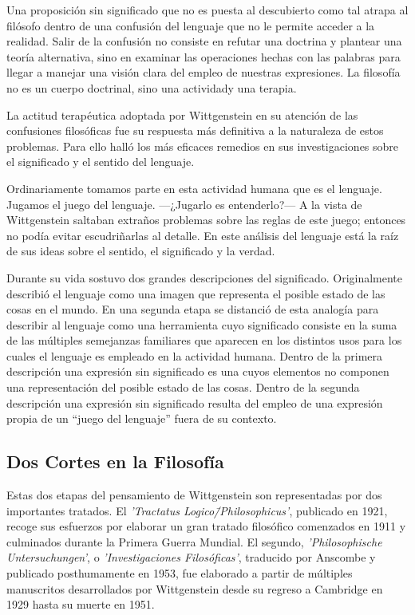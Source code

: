 Una proposición sin significado que no es puesta al descubierto como tal atrapa
al filósofo dentro de una confusión del lenguaje que no le permite acceder a la
realidad. Salir de la confusión no consiste en refutar una doctrina y plantear
una teoría alternativa, sino en examinar las operaciones hechas con las palabras
para llegar a manejar una visión clara del empleo de nuestras expresiones. La
filosofía no es un cuerpo doctrinal, sino una
actividad\autocite[cf.~][4.112]{wittgenstein1922tractatus}y una
terapia\autocite[cf.~][\S133]{wittgenstein1953phiinv}.

La actitud terapéutica adoptada por Wittgenstein en su atención de las
confusiones filosóficas fue su respuesta más definitiva a la naturaleza de estos
problemas. Para ello halló los más eficaces remedios en sus investigaciones
sobre el significado y el sentido del lenguaje.

Ordinariamente tomamos parte en esta actividad humana que es el lenguaje.
Jugamos el juego del lenguaje. ---¿Jugarlo es entenderlo?--- A la vista de
Wittgenstein saltaban extraños problemas sobre las reglas de este juego;
entonces no podía evitar escudriñarlas al
detalle.\autocite[cf.~][loc.7099]{monk1991duty} En este análisis del lenguaje está la
raíz de sus ideas sobre el sentido, el significado y la verdad.

Durante su vida sostuvo dos grandes descripciones del significado. Originalmente
describió el lenguaje como una imagen que representa el posible estado de las
cosas en el mundo. En una segunda etapa se distanció de esta analogía para
describir al lenguaje como una herramienta cuyo significado consiste en la suma
de las múltiples semejanzas familiares que aparecen en los distintos usos para
los cuales el lenguaje es empleado en la actividad humana. Dentro de la primera
descripción una expresión sin significado es una cuyos elementos no componen una
representación del posible estado de las cosas. Dentro de la segunda descripción
una expresión sin significado resulta del empleo de una expresión propia de un
``juego del lenguaje'' fuera de su contexto.

\subsection{Dos Cortes en la Filosofía}
 Estas dos etapas del pensamiento de Wittgenstein son representadas por dos
 importantes tratados. El \emph{'Tractatus Logico\=/Philosophicus'}, publicado en
 1921, recoge sus esfuerzos por elaborar un gran tratado filosófico comenzados en
 1911 y culminados durante la Primera Guerra Mundial. El segundo,
 \emph{'Philosophische Untersuchungen'}, o \emph{'Investigaciones Filosóficas'},
 traducido por Anscombe y publicado posthumamente en 1953, fue elaborado a partir
 de múltiples manuscritos desarrollados por Wittgenstein desde su regreso a
 Cambridge en 1929 hasta su muerte en 1951.

